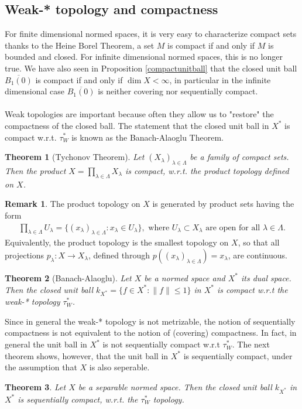 \documentclass[11pt,a4paper]{article}
\newtheorem{thm}{Theorem}[section]
\theoremstyle{definition}
\newtheorem{rem}{Remark}[section]
\begin{document}
\subsection{Weak-* topology and compactness}
For finite dimensional normed spaces, it is very easy to characterize compact sets thanks to the Heine Borel Theorem, a set $M$ is compact if and only if $M$ is bounded and closed. For infinite dimensional normed spaces, this is no longer true. We have also seen in Proposition \ref{compactunitball} that the closed unit ball $\overline{B_1(0)}$ is compact if and only if $\dim X < \infty$, in particular in the infinite dimensional case $\overline{B_1(0)}$ is neither covering nor sequentially compact. 
\\\\
Weak topologies are important because often they allow us to "restore" the compactness of the closed ball. The statement that the closed unit ball in $X^*$ is compact w.r.t. $\tau_W^*$ is known as the Banach-Alaoglu Theorem. 
\begin{thm}[Tychonov Theorem] Let $(X_\lambda)_{ \lambda \in \Lambda}$ be a family of compact sets. Then the product $X= \prod_{\lambda \in \Lambda}  X_\lambda$ is compact, w.r.t. the product topology defined on $X$. 
\end{thm}
\begin{rem} The product topology on $X$ is generated by product sets having the form 
\begin{align*}
\prod_{ \lambda \in \Lambda} U_\lambda = \lbrace (x_\lambda)_{ \lambda \in \Lambda} :  x_\lambda \in U_\lambda \rbrace, \text{ where } U_\lambda \subset X_\lambda \text{ are open for all } \lambda \in \Lambda. 
\end{align*}
Equivalently, the product topology is the smallest topology on $X$, so that all projections $p_\lambda : X \to  X_\lambda$, defined through $p((x_\lambda)_{ \lambda \in \Lambda}) = x_\lambda$, are continuous. 
\end{rem}
\begin{thm}[Banach-Alaoglu] Let $X$ be a normed space and $X^*$ its dual space. Then the closed unit ball $k_{X^*} = \lbrace f \in X^* : \| f \| \leq 1 \rbrace$ in $X^*$ is compact w.r.t the weak-* topology $\tau_W^*$. 
\end{thm}
\noindent Since in general the weak-* topology is not metrizable, the notion of sequentially compactness is not equivalent to the notion of (covering) compactness. In fact, in general the unit ball in $X^*$ is not sequentially compact w.r.t $\tau_W^*$. The next theorem shows, however, that the unit ball in $X^*$ is sequentially compact, under the assumption that $X$ is also seperable. 
\begin{thm} Let $X$ be a separable normed space. Then the closed unit ball $k_{X^*}$ in $X^*$ is sequentially compact, w.r.t. the $\tau_W^*$ topology. 
\end{thm}
\end{document}
